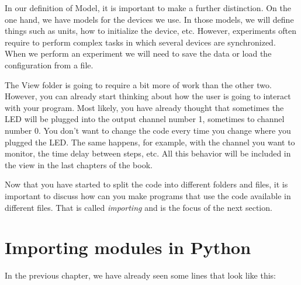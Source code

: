 
In our definition of Model, it is important to make a further distinction. On the one hand, we have models for the devices we use. In those models, we will define things such as units, how to initialize the device, etc. However, experiments often require to perform complex tasks in which several devices are synchronized. When we perform an experiment we will need to save the data or load the configuration from a file.


The View folder is going to require a bit more of work than the other two. However, you can already start thinking about how the user is going
to interact with your program. Most likely, you have already thought that sometimes the {LED} will be plugged into the output channel number 1,
sometimes to channel number 0. You don't want to change the code every time you change where you plugged the LED. The same happens, for example, with the channel you want to monitor, the time delay between steps, etc. All this behavior will be included in the view in the last chapters of the book.

Now that you have started to split the code into different folders and files, it is important to discuss how can you make programs that use the code available in different files. That is called \emph{importing} and is the focus of the next section.

\section{Importing modules in Python}\label{section:importing-python}
In the previous chapter, we have already seen some lines that look like this:


